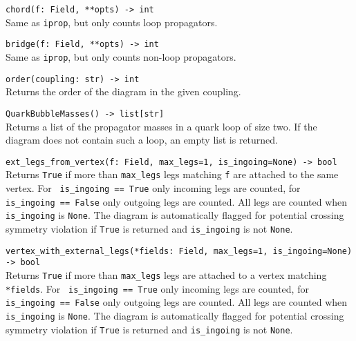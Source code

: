 \begin{basedescript}{\desclabelstyle{\pushlabel}}
   \item[\hspace{-1em}]\colorbox{gray!30}{\lstinline[style=pykw]|chord(f: Field, **opts) -> int|} \vspace{0.1cm}\\
   Same as \texttt{iprop}, but only counts loop propagators.

   \item[\hspace{-1em}]\colorbox{gray!30}{\lstinline[style=pykw]|bridge(f: Field, **opts) -> int|} \vspace{0.1cm}\\
   Same as \texttt{iprop}, but only counts non-loop propagators.

   \item[\hspace{-1em}]\colorbox{gray!30}{\lstinline[style=pykw]|order(coupling: str) -> int|} \vspace{0.1cm}\\
   Returns the order of the diagram in the given coupling.

   \item[\hspace{-1em}]\colorbox{gray!30}{\lstinline[style=pykw]|QuarkBubbleMasses() -> list[str]|} \vspace{0.1cm}\\
   Returns a list of the propagator masses in a quark loop of size two. If the diagram does not contain such a loop, an empty list is returned.  

   \item[\hspace{-1em}]\colorbox{gray!30}{\lstinline[style=pykw]{ext_legs_from_vertex(f: Field, max_legs=1, is_ingoing=None) -> bool}} \vspace{0.1cm}\\
   Returns \texttt{True} if more than \texttt{max\_legs} legs matching \texttt{f} are attached to the same vertex. For \lstinline[style=pykw]| is_ingoing == True| only incoming legs are counted, for \lstinline[style=pykw]| is_ingoing == False| only outgoing legs are counted. All legs are counted when \texttt{is\_ingoing} is \texttt{None}. The diagram is automatically flagged for potential crossing symmetry violation if \texttt{True} is returned and \texttt{is\_ingoing} is not \texttt{None}.

   \item[\hspace{-1em}]\colorbox{gray!30}{\lstinline[style=pykw]{vertex_with_external_legs(*fields: Field, max_legs=1, is_ingoing=None) -> bool}} \vspace{0.1cm}\\
   Returns \texttt{True} if more than \texttt{max\_legs} legs are attached to a vertex matching \texttt{*fields}. For \lstinline[style=pykw]| is_ingoing == True| only incoming legs are counted, for \lstinline[style=pykw]| is_ingoing == False| only outgoing legs are counted. All legs are counted when \texttt{is\_ingoing} is \texttt{None}. The diagram is automatically flagged for potential crossing symmetry violation if \texttt{True} is returned and \texttt{is\_ingoing} is not \texttt{None}.


\end{basedescript}
